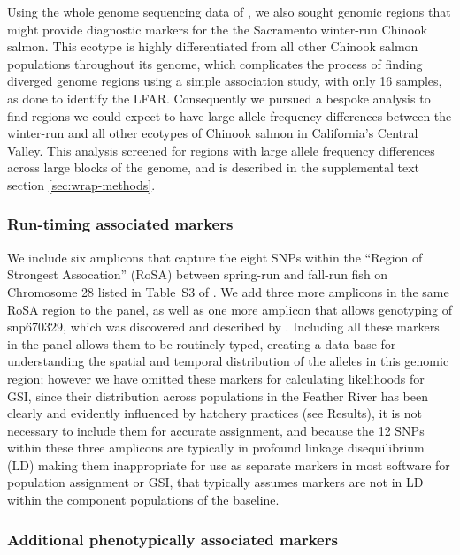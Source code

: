 Using the whole genome sequencing data of \citet{thompson2020complex}, we also sought
genomic regions that might provide diagnostic markers for the the Sacramento winter-run
Chinook salmon.  This ecotype is highly differentiated from all other Chinook salmon populations
throughout its genome, which complicates the process of finding diverged genome regions using
a simple association study, with only 16 samples, as done to identify the LFAR.  Consequently we pursued a bespoke
analysis to find regions we could expect to have large allele frequency differences between
the winter-run and all other ecotypes of Chinook salmon in California's Central Valley.   This analysis
screened for regions with large allele frequency differences across large blocks of the genome, and is
described in the supplemental text section \ref{sec:wrap-methods}.

\subsubsection*{Run-timing associated markers}

We include six amplicons that capture the eight  SNPs within the ``Region of Strongest Assocation'' (RoSA)
between spring-run and fall-run fish on Chromosome 28 listed in Table~S3 of \citet{thompson2020complex}.
We add three more amplicons in the same RoSA region to the panel, as well as one more amplicon that
allows genotyping of snp670329, which was discovered and described by \citet{thompson2019anthropogenic}.
Including all these markers in the panel allows them to be routinely typed, creating
 a data base for understanding the spatial and temporal
distribution of the alleles in this genomic region; however we have omitted these markers for calculating likelihoods for
GSI, since their distribution across populations in the Feather River has been clearly and evidently
influenced by hatchery practices (see Results), it is not necessary to include them for accurate assignment,
and because the 12 SNPs within these three amplicons are typically in profound linkage disequilibrium (LD)
making them inappropriate for use as separate markers in most software for population assignment or GSI, that
typically assumes markers are not in LD within the component populations of the baseline.




\subsubsection*{Additional phenotypically associated markers}

